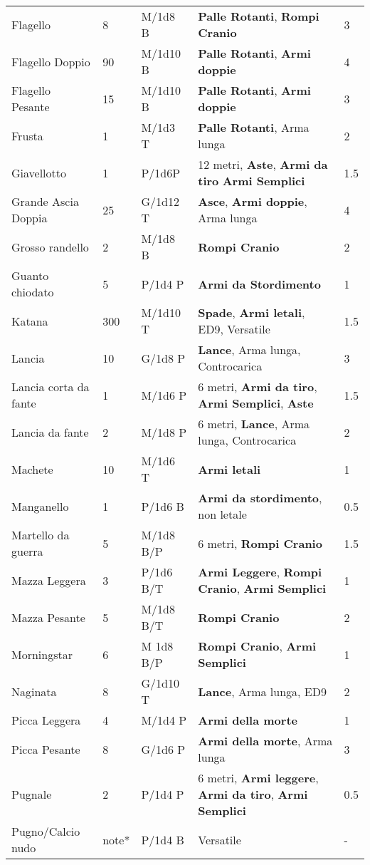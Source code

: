 \documentclass[a4paper,12 pt,openany]{book}
\begin{document}
\begin{textblock*}{19.5cm}
\begin{tabular}{lllll}
Flagello& 8& M/1d8 B& \textbf{Palle Rotanti}, \textbf{Rompi Cranio}& 3\\
Flagello Doppio& 90 & M/1d10 B& \textbf{Palle Rotanti}, \textbf{Armi doppie} & 4\\
Flagello Pesante& 15 & M/1d10 B& \textbf{Palle Rotanti}, \textbf{Armi doppie}& 3\\
Frusta& 1& M/1d3 T& \textbf{Palle Rotanti}, Arma lunga& 2\\
Giavellotto& 1& P/1d6P& 12 metri, \textbf{Aste}, \textbf{Armi da tiro} \textbf{Armi Semplici}& 1.5\\
Grande Ascia Doppia& 25 & G/1d12 T& \textbf{Asce}, \textbf{Armi doppie}, Arma lunga& 4\\
Grosso randello& 2& M/1d8 B&\textbf{Rompi Cranio}& 2\\
Guanto chiodato& 5& P/1d4 P&\textbf{Armi da Stordimento}& 1\\
Katana& 300& M/1d10 T& \textbf{Spade}, \textbf{Armi letali}, ED9, Versatile& 1.5\\
Lancia& 10 & G/1d8 P&\textbf{Lance}, Arma lunga, Controcarica& 3\\
Lancia corta da fante& 1& M/1d6 P& 6 metri, \textbf{Armi da tiro}, \textbf{Armi Semplici}, \textbf{Aste} & 1.5\\
Lancia da fante& 2& M/1d8 P&6 metri, \textbf{Lance}, Arma lunga, Controcarica& 2 \\
Machete& 10 & M/1d6 T&\textbf{Armi letali} & 1\\
Manganello& 1& P/1d6 B& \textbf{Armi da stordimento}, non letale& 0.5\\
Martello da guerra& 5& M/1d8 B/P& 6 metri, \textbf{Rompi Cranio}& 1.5\\
Mazza Leggera& 3& P/1d6 B/T& \textbf{Armi Leggere}, \textbf{Rompi Cranio}, \textbf{Armi Semplici}&1\\
Mazza Pesante& 5& M/1d8 B/T& \textbf{Rompi Cranio}& 2\\
Morningstar& 6& M 1d8 B/P&\textbf{Rompi Cranio},\textbf{ Armi Semplici}& 1\\
Naginata& 8& G/1d10 T&\textbf{Lance}, Arma lunga, ED9& 2\\
Picca Leggera& 4& M/1d4 P&\textbf{Armi della morte}& 1\\
Picca Pesante& 8& G/1d6 P&\textbf{Armi della morte}, Arma lunga& 3\\
Pugnale& 2& P/1d4 P& 6 metri, \textbf{Armi leggere}, \textbf{Armi da tiro}, \textbf{Armi Semplici}& 0.5\\
Pugno/Calcio nudo& note*& P/1d4 B&Versatile& -\\

\end{tabular}
\end{textblock*}
\end{document}
